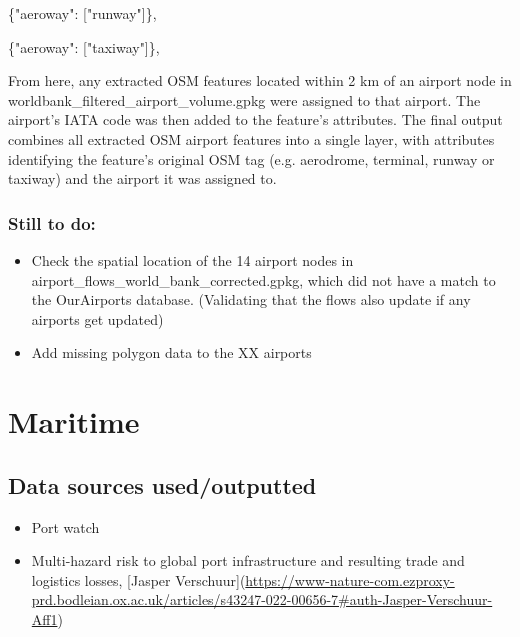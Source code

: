 \documentclass[11pt,a4paper]{article}
\begin{document}
\{"aeroway": ["runway"]\},\par

\{"aeroway": ["taxiway"]\},\par

From here, any extracted OSM features located within 2 km of an airport node in worldbank\_filtered\_airport\_volume.gpkg were assigned to that airport. The airport’s IATA code was then added to the feature’s attributes. The final output combines all extracted OSM airport features into a single layer, with attributes identifying the feature’s original OSM tag (e.g. aerodrome, terminal, runway or taxiway) and the airport it was assigned to.\par



\subsubsection{Still to do:}

\begin{itemize}
\item Check the spatial location of the 14 airport nodes in airport\_flows\_world\_bank\_corrected.gpkg, which did not have a match to the OurAirports database. (Validating that the flows also update if any airports get updated)
\end{itemize}

\begin{itemize}
\item Add missing polygon data to the XX airports
\end{itemize}

\section{Maritime}

\subsection{Data sources used/outputted}

\begin{itemize}
\item Port watch
\end{itemize}

\begin{itemize}
\item Multi-hazard risk to global port infrastructure and resulting trade and logistics losses, [Jasper Verschuur](\url{https://www-nature-com.ezproxy-prd.bodleian.ox.ac.uk/articles/s43247-022-00656-7\#auth-Jasper-Verschuur-Aff1})
\end{itemize}
\end{document}
